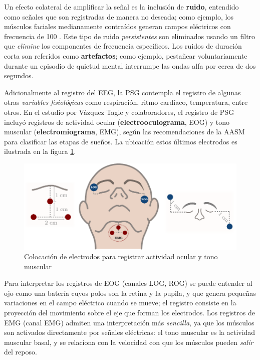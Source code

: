 Un efecto colateral de amplificar la señal es la inclusión de \textbf{ruido}, entendido como 
señales que son registradas de manera no deseada; como ejemplo, los músculos faciales medianamente 
contraídos generan campos eléctricos con frecuencia de 100 \hz.
%
Este tipo de ruido \textit{persistentes} son eliminados usando un filtro que \textit{elimine} los 
componentes de frecuencia específicos.
%
Los ruidos de duración corta son referidos como \textbf{artefactos}; como ejemplo, pestañear 
voluntariamente durante un episodio de quietud mental interrumpe las ondas alfa por cerca de dos 
segundos. 

Adicionalmente al registro del EEG, la PSG contempla el registro de algunas otras \textit{variables 
fisiológicas} como respiración, ritmo cardíaco, temperatura, entre otros. 
%
En el estudio por Vázquez Tagle y colaboradores, el registro de PSG incluyó registros de actividad 
ocular (\textbf{electrooculograma}, EOG) y tono muscular (\textbf{electromiograma}, EMG), según las 
recomendaciones de la AASM para clasificar las etapas de sueños. La ubicación estos últimos 
electrodos es ilustrada en la figura \ref{emg_eog}.

\begin{figure}
\centering
\includegraphics[width=\linewidth]
{./img_diagramas/emg_eog_v4.pdf}
\caption{Colocación de electrodos para registrar actividad ocular y tono muscular}
\label{emg_eog}
\end{figure}

Para interpretar los registros de EOG (canales LOG, ROG) se puede entender al ojo como una batería
cuyos  polos son la retina y la pupila, y que genera pequeñas variaciones en el campo eléctrico
cuando se mueve; el registro consiste en la proyección del movimiento sobre el eje que forman los
electrodos.
%
Los registros de EMG (canal EMG) admiten una interpretación más \textit{sencilla}, ya que los
músculos son activados directamente por señales eléctricas: el tono muscular es la actividad 
muscular basal, y se relaciona con la velocidad con que los músculos pueden \textit{salir} del 
reposo.

